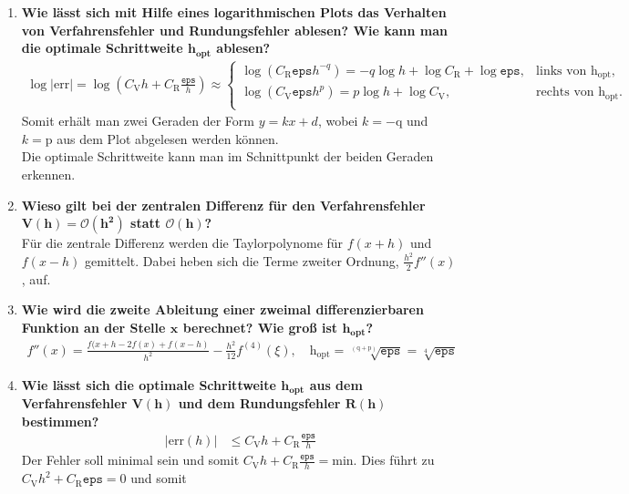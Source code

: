 \begin{enumerate}
\begin{figure}[!htbp]
\begin{minipage}{.5\textwidth}
				\end{minipage}
			\end{figure}			
		\item \textbf{Wie lässt sich mit Hilfe eines logarithmischen Plots das Verhalten von Verfahrensfehler und Rundungsfehler ablesen? Wie kann man die optimale Schrittweite \(\mathbf{h_{opt}}\) ablesen?}
			\begin{align*}
				\log |\text{err}|=\log \left( C_\text{V} h + C_\text{R} \frac{\texttt{eps}}{h}\right) \approx 
					\begin{cases}
						\log\left(C_\text{R}\texttt{eps}h^{-q}\right) =-q\log h + \log C_\text{R}+\log\texttt{eps}  , & \text{links von }  \text{h}_\text{opt},\\
						\log\left(C_\text{V}\texttt{eps}h^p\right) =p\log h + \log C_\text{V} , & \text{rechts von }  \text{h}_\text{opt}.		\\	
					\end{cases}
			\end{align*}
			Somit erhält man zwei Geraden der Form \(y=kx+d\), wobei \(k=-\text{q}\) und \(k=\text{p}\) aus dem Plot abgelesen werden können.\\
			Die optimale Schrittweite kann man im Schnittpunkt der beiden Geraden erkennen. 
		\item \textbf{Wieso gilt bei der zentralen Differenz für den Verfahrensfehler \(\mathbf{V(h)=\mathcal{O}(h^2)}\) statt \(\mathbf{\mathcal{O}(h)}\)?}\\
			Für die zentrale Differenz werden die Taylorpolynome für \(f(x+h)\) und \(f(x-h)\) gemittelt. Dabei heben sich die Terme zweiter Ordnung, \(\frac{h^2}{2}f''(x)\), auf.
		\item \textbf{Wie wird die zweite Ableitung einer zweimal differenzierbaren Funktion an der Stelle \(\mathbf{x}\) berechnet? Wie groß ist \(\mathbf{h_{opt}}\)?}
			\begin{align*}
				f''(x)=\frac{f(x+h-2f(x)+f(x-h)}{h^2}-\frac{h^2}{12}f^{(4)}(\xi), \quad \text{h}_\text{opt}=\sqrt[\left( \text{q}+\text{p}\right) ]{\texttt{eps}}=\sqrt[4]{\texttt{eps}}
			\end{align*}
		\item \textbf{Wie lässt sich die optimale Schrittweite \(\mathbf{h_{opt}}\) aus dem Verfahrensfehler \(\mathbf{V(h)}\) und dem Rundungsfehler \(\mathbf{R(h)}\) bestimmen?}
			\begin{align*}
				|\text{err}(h)|&\leq C_\text{V} h + C_\text{R} \frac{\texttt{eps}}{h}
			\end{align*}
			Der Fehler soll minimal sein und somit \(C_\text{V} h + C_\text{R} \frac{\texttt{eps}}{h}=\text{min}.\) Dies führt zu \(C_\text{V} h^2 + C_\text{R}\texttt{eps}=0\) und somit

\end{enumerate}
